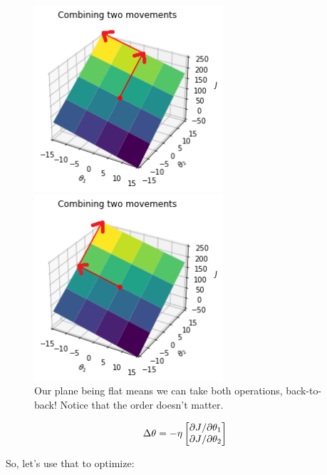         \begin{figure}[H]
        \centering
            \includegraphics[width=70mm,scale=0.5]{images/gradient_descent_images/thetaboth_movement_plane.png}

            \includegraphics[width=70mm,scale=0.5]{images/gradient_descent_images/thetaboth_movement_plane_reversed.png}
                
            \caption*{Our plane being flat means we can take both operations, back-to-back! Notice that the order doesn't matter.}
        \end{figure}
        
        \begin{equation}
            \Delta \theta
            =
            - \eta 
            \begin{bmatrix}
                  {\partial J}/{\partial \theta_1} \\ {\partial J}/{\partial \theta_2} 
            \end{bmatrix}
        \end{equation}
        
        So, let's use that to optimize:\\
        
